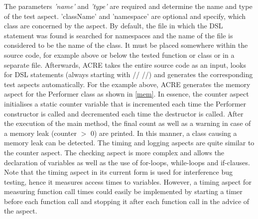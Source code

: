 The parameters \textit{'name'} and \textit{'type'} are required and determine the name and type of the test aspect. 'className' and 'namespace' are optional and specify, which class are concerned by the aspect. By default, the file in which the DSL statement was found is searched for namespaces and the name of the file is considered to be the name of the class.  It must be placed somewhere within the source code, for example above or below the tested function or class or in a separate file. Afterwards, ACRE takes the entire source code as an input, looks for DSL statements (always starting with // //) and generates the corresponding test aspects automatically. For the example above, ACRE generates the memory aspect for the Performer class as shown in \autoref{mem}. In essence, the counter aspect initialises a static counter variable that is incremented each time the Performer constructor is called and decremented each time the destructor is called. After the execution of the main method, the final count as well as a warning in case of a memory leak (counter $>$ 0) are printed. In this manner, a class causing a memory leak can be detected. The timing and logging aspects are quite similar to the counter aspect. The checking aspect is more complex and allows the declaration of variables as well as the use of for-loops, while-loops and if-clauses. Note that the timing aspect in its current form is used for interference bug testing, hence it measures access times to variables. However, a timing aspect for measuring function call times could easily be implemented by starting a timer before each function call and stopping it after each function call in the advice of the aspect.

